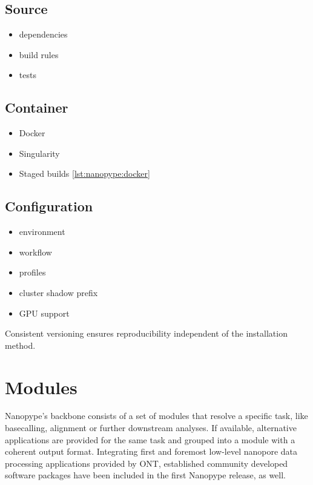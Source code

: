 \subsection{Source}

\begin{itemize}
	\item dependencies
	\item build rules
	\item tests
\end{itemize}

\subsection{Container}



\begin{itemize}
	\item Docker
	\item Singularity
	\item Staged builds \ref{lst:nanopype:docker}
\end{itemize}


\subsection{Configuration}

\begin{itemize}
	\item environment
	\item workflow
	\item profiles
	\item cluster
	\subitem shadow prefix
	\item GPU support
\end{itemize}

Consistent versioning ensures reproducibility independent of the installation method.




\section{Modules}
\label{sec:nanopype:modules}
Nanopype’s backbone consists of a set of modules that resolve a specific task, like basecalling, alignment or further downstream analyses. If available, alternative applications are provided for the same task and grouped into a module with a coherent output format. Integrating first and foremost low-level nanopore data processing applications provided by ONT, established community developed software packages have been included in the first Nanopype release, as well.

